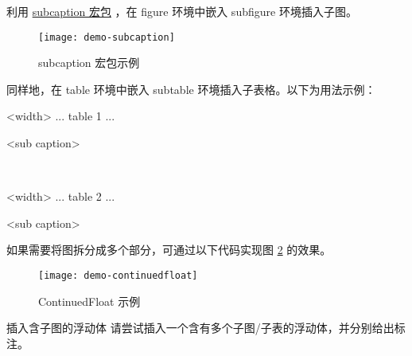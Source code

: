 利用 \href{http://www.ctan.org/pkg/subcaption}{subcaption 宏包} \cite{subcaption}，在 figure 环境中嵌入 subfigure 环境插入子图。
\begin{figure}[]
  \centering
  \texttt{[image: demo-subcaption]}
  \caption{subcaption 宏包示例}
  \label{demo-subcaption}
\end{figure}
同样地，在 table 环境中嵌入 subtable 环境插入子表格。以下为用法示例：
\begin{texlst}
\begin{table}[<placement specifier>]
  \begin{subtable}{<width>}
      \centering
      ... table 1 ...
  \caption{<sub caption>}
  \end{subtable}
  ~
  \begin{subtable}{<width>}
      \centering
      ... table 2 ...
      \caption{<sub caption>}
  \end{subtable}
\end{table}
\end{texlst}

如果需要将图拆分成多个部分，可通过以下代码实现图 \ref{demo-continuedfloat} 的效果。
\begin{figure}[]
  \centering
  \texttt{[image: demo-continuedfloat]}
  \caption{ContinuedFloat 示例}
  \label{demo-continuedfloat}
\end{figure}

\begin{Ex}{插入含子图的浮动体}
请尝试插入一个含有多个子图/子表的浮动体，并分别给出标注。
\end{Ex}